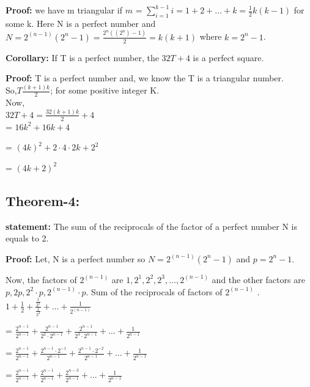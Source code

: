 \documentclass[12pt,,a4paper]{book}
\begin{document}
\textbf{Proof:}  we have m triangular if \(m\) = $\sum\limits_{i=1}^{k-1} i = 1 + 2 + \ldots + k = \frac{1}{2}k(k-1)$ for some k. Here N is a perfect number and\(N = 2^{(n-1)}(2^n-1) = \frac{{2^n((2^n)-1)}}{2} = k(k+1)\) where \(k = 2^n-1\).\\
\vspace{10pt}

\textbf{Corollary:}  If  T is a perfect  number, the  $32T + 4$ is a perfect square.
 

\textbf{Proof:} T is a perfect number and, we know the T  is a triangular number.\\

So,\(T \frac{(k+1)k}{2}\); for some positive integer K.\\

Now,\\

\(32T+4 = \frac{32(k+1)k}{2} + 4\) \\

 = \(16k^2 + 16k + 4\)

 = \((4k)^2 + 2 \cdot 4 \cdot 2k + 2^2\)

= \((4k+2)^2\)
\vspace{10pt}\\

\subsection*{Theorem-4:}
\textbf{statement:} The sum of the reciprocals of the factor of a perfect number N is equals to 2.

\textbf{Proof:} Let, N is a perfect number so \(N = 2^{(n-1)}(2^n-1)\) and \(p = 2^n-1\).

Now, the factors of \(2^{(n-1)}\) are \(1, 2^1, 2^2, 2^3, \ldots, 2^{(n-1)}\) and the other factors are \(p, 2p, 2^2 \cdot p, 2^{(n-1)} \cdot p\).  Sum of the reciprocals of factors of \(2^{(n-1)}\) . \\
$1 + \frac{1}{2} + \frac{\frac{1}{2^2}}{\frac{1}{2^3}} + \ldots + \frac{1}{2^{(n-1)}}$

= $\frac{2^{n-1}}{2^{n-1}} + \frac{2^{n-1}}{2^2 \cdot 2^{n-1}} + \frac{2^{n-1}}{2^3 \cdot 2^{n-1}} + \ldots + \frac{1}{2^{n-1}}$

=  $\frac{2^{n-1}}{2^{n-1}} + \frac{2^{n-1} \cdot 2^{-1}}{2^{n-1}} + \frac{2^{n-1} \cdot 2^{-2}}{2^{n-1}} + \ldots + \frac{1}{2^{n-1}}$

=  $\frac{2^{n-1}}{2^{n-1}} + \frac{2^{n-1}}{2^{n-1}} + \frac{2^{n-3}}{2^{n-1}} + \ldots + \frac{1}{2^{n-1}}$
\end{document}
